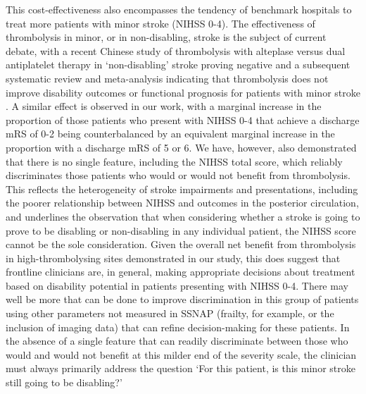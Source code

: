 This cost-effectiveness also encompasses the tendency of benchmark hospitals to treat more patients with minor stroke (NIHSS 0-4). The effectiveness of thrombolysis in minor, or in non-disabling, stroke is the subject of current debate, with a recent Chinese study of thrombolysis with alteplase versus dual antiplatelet therapy in ‘non-disabling’ stroke\cite{chen_dual_2023} proving negative and a subsequent systematic review and meta-analysis indicating that thrombolysis does not improve disability outcomes or functional prognosis for patients with minor stroke \cite{zhang_intravenous_2024}. A similar effect is observed in our work, with a marginal increase in the proportion of those patients who present with NIHSS 0-4 that achieve a discharge mRS of 0-2 being counterbalanced by an equivalent marginal increase in the proportion with a discharge mRS of 5 or 6. We have, however, also demonstrated that there is no single feature, including the NIHSS total score, which reliably discriminates those patients who would or would not benefit from thrombolysis. This reflects the heterogeneity of stroke impairments and presentations, including the poorer relationship between NIHSS and outcomes in the posterior circulation, and underlines the observation that when considering whether a stroke is going to prove to be disabling or non-disabling in any individual patient, the NIHSS score cannot be the sole consideration\cite{braksick_thrombolysis_2024}. Given the overall net benefit from thrombolysis in high-thrombolysing sites demonstrated in our study, this does suggest that frontline clinicians are, in general, making appropriate decisions about treatment based on disability potential in patients presenting with NIHSS 0-4. There may well be more that can be done to improve discrimination in this group of patients using other parameters not measured in SSNAP (frailty, for example, or the inclusion of imaging data) that can refine decision-making for these patients. In the absence of a single feature that can readily discriminate between those who would and would not benefit at this milder end of the severity scale, the clinician must always primarily address the question ‘For this patient, is this minor stroke still going to be disabling?’

